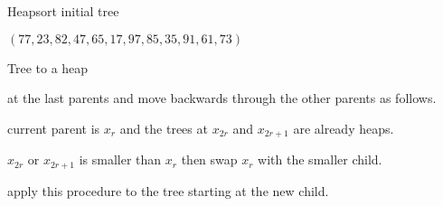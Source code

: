 \documentclass{beamer}
\begin{document}
\begin{frame}[fragile]{Heapsort initial tree}
  \begin{center}
    $(77,23,82,47,65,17,97,85,35,91,61,73)$ \\[1cm]
  \end{center}
\end{frame}


\begin{frame}{Tree to a heap}
  \begin{description}
    \setlength\itemsep{4mm}
    \item[Start] at the last parents and move backwards through the other parents as follows.
    \item[Suppose] current parent is $x_r$ and the trees at $x_{2r}$ and $x_{2r+1}$ are already heaps.
    \item[If] $x_{2r}$ or $x_{2r+1}$ is smaller than $x_r$ then swap $x_r$ with the smaller child.
    \item[If necessary] apply this procedure to the tree starting at the new child.
  \end{description}
\end{frame}
\end{document}
